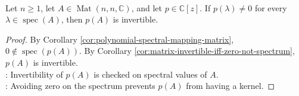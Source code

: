 \begin{corollary} \label{cor:polynomial-in-matrix-invertible-spectrum-test} \\
Let $n\geq1$, let $A\in\operatorname{Mat}(n,n,\mathbb{C})$, and let $p\in\mathbb{C}[z]$. If $p(\lambda)\neq0$ for every $\lambda\in\operatorname{spec}(A)$, then $p(A)$ is invertible.
\begin{proof}
By Corollary \ref{cor:polynomial-spectral-mapping-matrix}, $0\notin\operatorname{spec}(p(A))$. By Corollary \ref{cor:matrix-invertible-iff-zero-not-spectrum}, $p(A)$ is invertible.\\
: Invertibility of $p(A)$ is checked on spectral values of $A$.\\
: Avoiding zero on the spectrum prevents $p(A)$ from having a kernel.
\end{proof}
\end{corollary}
